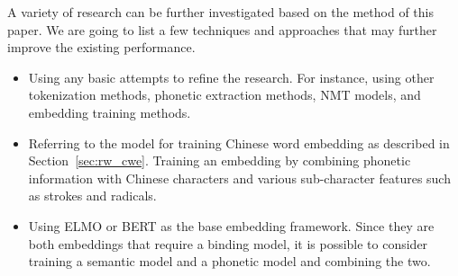 A variety of research can be further investigated based on the method of this paper. We are going to list a few techniques and approaches that may further improve the existing performance.

\begin{itemize}
    \item Using any basic attempts to refine the research. For instance, using other tokenization methods, phonetic extraction methods, NMT models, and embedding training methods.
    \item Referring to the model for training Chinese word embedding as described in Section~\ref{sec:rw_cwe}. Training an embedding by combining phonetic information with Chinese characters and various sub-character features such as strokes and radicals.
    \item Using ELMO or BERT as the base embedding framework. Since they are both embeddings that require a binding model, it is possible to consider training a semantic model and a phonetic model and combining the two.
\end{itemize}
